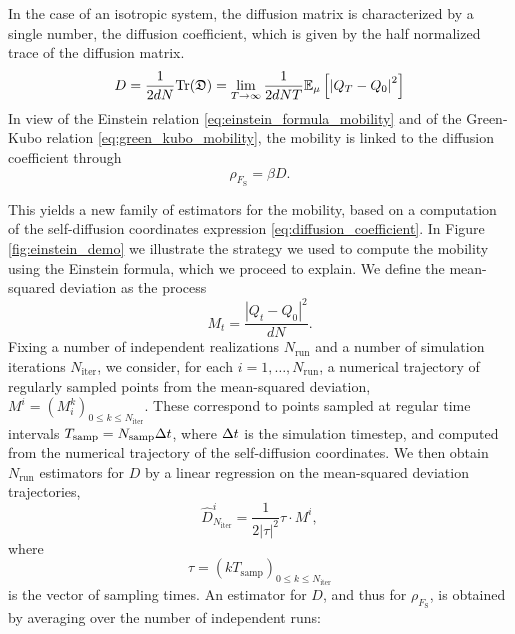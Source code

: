 \begin{remark}
    In the case of an isotropic system, the diffusion matrix is characterized by a single number, the diffusion coefficient, which is given by the half normalized trace of the diffusion matrix.
    \begin{equation}
        \label{eq:diffusion_coefficient}
        D=\frac{1}{2dN}\mathrm{Tr}(\mathfrak D)=\underset{T\to\infty}{\lim}\,\frac{1}{2dNT}\mathbb{E}_\mu\left[\left|Q_T-Q_0\right|^2\right]
    \end{equation}
    In view of the Einstein relation \eqref{eq:einstein_formula_mobility} and of the Green-Kubo relation \eqref{eq:green_kubo_mobility}, the mobility is linked to the diffusion coefficient through
    \begin{equation}
        \label{eq:mobility_from_einstein}
        \rho_{F_{\mathrm{S}}}=\beta D.
    \end{equation}
\end{remark}
    This yields a new family of estimators for the mobility, based on a computation of the self-diffusion coordinates expression \eqref{eq:diffusion_coefficient}.
    In Figure \ref{fig:einstein_demo} we illustrate the strategy we used to compute the mobility using the Einstein formula, which we proceed to explain.
    We define the mean-squared deviation as the process
    \begin{equation}
        \label{eq:mean_squared_deviation}
        M_t=\frac{|Q_t-Q_0|^2}{dN}.
    \end{equation}
    Fixing a number of independent realizations $N_{\mathrm{run}}$ and a number of simulation iterations $N_{\mathrm{iter}}$, we consider, for each $i=1,\dots,N_{\mathrm{run}}$, a numerical trajectory of regularly sampled points from the mean-squared deviation,
    $M^i=(M_i^{k})_{0\leq k\leq N_{\mathrm{iter}}}.$ 
    These correspond to points sampled at regular time intervals $T_{\mathrm{samp}}=N_{\mathrm{samp}}{\Delta t}$, where ${\Delta t}$ is the simulation timestep, and computed from the numerical trajectory of the self-diffusion coordinates.
    We then obtain $N_{\mathrm{run}}$ estimators for $D$ by a linear regression on the mean-squared deviation trajectories, 
    \begin{equation}
        \widehat{D}^i_{N_{\mathrm{iter}}}= \frac{1}{2|\tau|^2} \tau\cdot M^i,
    \end{equation}
    where \[\tau=(kT_{\mathrm{samp}})_{0\leq k\leq N_{\mathrm{iter}}}\]
    is the vector of sampling times. An estimator for $D$, and thus for $\rho_{F_{\mathrm{S}}}$, is obtained by averaging over the number of independent runs:
